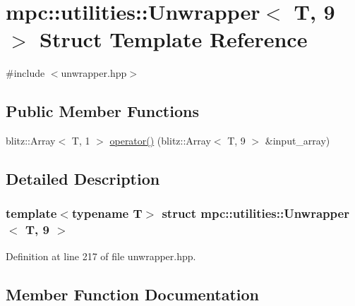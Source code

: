 \hypertarget{structmpc_1_1utilities_1_1_unwrapper_3_01_t_00_019_01_4}{}\section{mpc\+:\+:utilities\+:\+:Unwrapper$<$ T, 9 $>$ Struct Template Reference}
\label{structmpc_1_1utilities_1_1_unwrapper_3_01_t_00_019_01_4}


{\ttfamily \#include $<$unwrapper.\+hpp$>$}

\subsection*{Public Member Functions}
\begin{DoxyCompactItemize}
\item 
blitz\+::\+Array$<$ T, 1 $>$ \mbox{\hyperlink{structmpc_1_1utilities_1_1_unwrapper_3_01_t_00_019_01_4_a9f1406a554959171da00da02679ec7d8}{operator()}} (blitz\+::\+Array$<$ T, 9 $>$ \&input\+\_\+array)
\end{DoxyCompactItemize}


\subsection{Detailed Description}
\subsubsection*{template$<$typename T$>$\newline
struct mpc\+::utilities\+::\+Unwrapper$<$ T, 9 $>$}



Definition at line 217 of file unwrapper.\+hpp.



\subsection{Member Function Documentation}
\mbox{\label{structmpc_1_1utilities_1_1_unwrapper_3_01_t_00_019_01_4_a9f1406a554959171da00da02679ec7d8}} 
